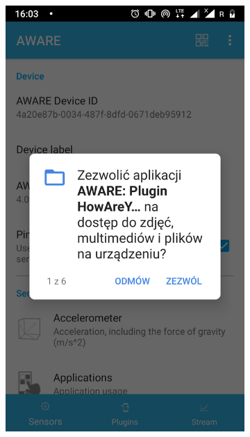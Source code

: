 \begin{enumerate}
	\begin{figure}[H]
		\centering
		\begin{subfigure}{0.35\textwidth}
			\centering
			\includegraphics[scale=0.13]{dodatekA/3_5.png}
			\subcaption{\label{subfigure_a}}
		\end{subfigure}
		\begin{subfigure}{0.35\textwidth}
			\centering

\end{subfigure}
\end{figure}
\end{enumerate}
